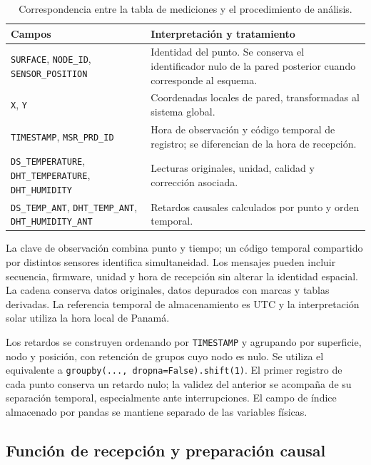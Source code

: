 \begin{table}[htbp]
\centering
\small
\caption{Correspondencia entre la tabla de mediciones y el procedimiento de análisis.}
\label{met:tabla_contrato}
\begingroup
\renewcommand{\arraystretch}{1.24}
\begin{tabularx}{\textwidth}{>{\raggedright\arraybackslash}p{}>{\raggedright\arraybackslash}X}
\toprule
Campos & Interpretación y tratamiento \\
\midrule
\texttt{SURFACE}, \texttt{NODE\_ID}, \texttt{SENSOR\_POSITION} & Identidad del punto. Se conserva el identificador nulo de la pared posterior cuando corresponde al esquema. \\
\texttt{X}, \texttt{Y} & Coordenadas locales de pared, transformadas al sistema global. \\
\texttt{TIMESTAMP}, \texttt{MSR\_PRD\_ID} & Hora de observación y código temporal de registro; se diferencian de la hora de recepción. \\
\texttt{DS\_TEMPERATURE}, \texttt{DHT\_TEMPERATURE}, \texttt{DHT\_HUMIDITY} & Lecturas originales, unidad, calidad y corrección asociada. \\
\texttt{DS\_TEMP\_ANT}, \texttt{DHT\_TEMP\_ANT}, \texttt{DHT\_HUMIDITY\_ANT} & Retardos causales calculados por punto y orden temporal. \\
\bottomrule
\end{tabularx}
\endgroup
\end{table}

La clave de observación combina punto y tiempo; un código temporal compartido por distintos sensores identifica simultaneidad. Los mensajes pueden incluir secuencia, firmware, unidad y hora de recepción sin alterar la identidad espacial. La cadena conserva datos originales, datos depurados con marcas y tablas derivadas. La referencia temporal de almacenamiento es UTC y la interpretación solar utiliza la hora local de Panamá.

Los retardos se construyen ordenando por \texttt{TIMESTAMP} y agrupando por superficie, nodo y posición, con retención de grupos cuyo nodo es nulo. Se utiliza el equivalente a \texttt{groupby(..., dropna=False).shift(1)}. El primer registro de cada punto conserva un retardo nulo; la validez del anterior se acompaña de su separación temporal, especialmente ante interrupciones. El campo de índice almacenado por pandas se mantiene separado de las variables físicas.

\subsection{Función de recepción y preparación causal}
\label{met:lambda}

